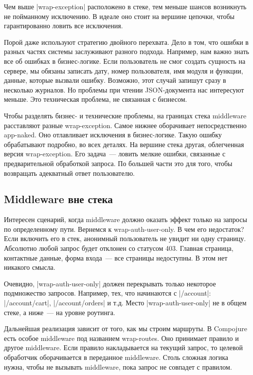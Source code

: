 Чем выше \spverb|wrap-exception| расположено в стеке, тем меньше шансов возникнуть не
пойманному исключению. В идеале оно стоит на вершине цепочки, чтобы
гарантированно ловить все исключения.

Порой даже используют стратегию двойного перехвата. Дело в том, что ошибки в
разных частях системы заслуживают разного подхода. Например, нам важно знать все
об ошибках в бизнес-логике. Если пользователь не смог создать сущность на
сервере, мы обязаны записать дату, номер пользователя, имя модуля и функции,
данные, которые вызвали ошибку. Возможно, этот случай запишут сразу в несколько
журналов. Но проблемы при чтении JSON-документа нас интересуют меньше. Это
техническая проблема, не связанная с бизнесом.

Чтобы разделять бизнес- и технические проблемы, на границах стека middleware
расставляют разные wrap-exception. Самое нижнее оборачивает непосредственно
app-naked. Оно отлавливает исключения в бизнес-логике. Такую ошибку обрабатывают
подробно, во всех деталях. На вершине стека другая, облегченная версия
wrap-exception. Его задача~--- ловить мелкие ошибки, связанные с предварительной
обработкой запроса. По большей части это для того, чтобы возвращать адекватный
ответ пользователю.

\subsection{Middleware вне стека}

Интересен сценарий, когда middleware должно оказать эффект только на запросы по
определенному пути. Вернемся к wrap-auth-user-only. В чем его недостаток? Если
включить его в стек, анонимный пользователь не увидит ни одну
страницу. Абсолютно любой запрос будет отклонен со статусом 403. Главная
страница, контактные данные, форма входа~--- все страницы недоступны. В этом нет
никакого смысла.

Очевидно, \spverb|wrap-auth-user-only| должен перекрывать только некоторое подмножество
запросов. Например, тех, что начинаются с \spverb|/account|: \spverb|/account/cart|,
\spverb|/account/orders| и т.д. Место \spverb|wrap-auth-user-only| не в общем стеке, а ниже~---
на уровне роутинга.

Дальнейшая реализация зависит от того, как мы строим маршруты. В Compojure есть
особое middleware под названием wrap-routes. Оно принимает правило и другое
middleware. Если правило накладывается на текущий запрос, то целевой обработчик
оборачивается в переданное middleware. Столь сложная логика нужна, чтобы не
вызывать middleware, пока запрос не совпадет с правилом.


